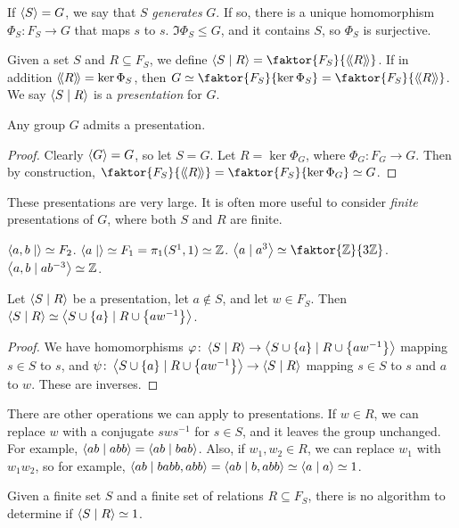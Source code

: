 If \( \left\langle{} S \right\rangle = G \), we say that \( S \) \emph{generates} \( G \).
If so, there is a unique homomorphism \( \Phi_S \colon F_S \to G \) that maps \( s \) to \( s \).
\( \Im \Phi_S \leq G \), and it contains \( S \), so \( \Phi_S \) is surjective.
\begin{definition}
	Given a set \( S \) and \( R \subseteq F_S \), we define \( \genset{S\mid R} = \faktor{F_S}{\ngenset R} \).
	If in addition \( \left\langle\!\left\langle{} R \right\rangle\!\right\rangle = \ker \Phi_S \), then \( G \simeq \faktor{F_S}{\ker \Phi_S} = \faktor{F_S}{\ngenset R} \).
	We say \( \left\langle{} S\mid R \right\rangle \) is a \emph{presentation} for \( G \).
\end{definition}
\begin{proposition}
	Any group \( G \) admits a presentation.
\end{proposition}
\begin{proof}
	Clearly \( \left\langle{} G \right\rangle = G \), so let \( S = G \).
	Let \( R = \ker \Phi_G \), where \( \Phi_G \colon F_G \to G \).
	Then by construction, \( \faktor{F_S}{\ngenset R} = \faktor{F_S}{\ker \Phi_G} \simeq G \).
\end{proof}
\begin{remark}
	These presentations are very large.
	It is often more useful to consider \emph{finite} presentations of \( G \), where both \( S \) and \( R \) are finite.
\end{remark}
\begin{example}
	\( \left\langle{} a,b \mid \right\rangle \simeq F_2 \).
	\( \left\langle{} a \mid \right\rangle \simeq F_1 = \pi_1(S^1,1) \simeq \mathbb Z \).
	\( \genset{a \mid a^3} \simeq \faktor{\mathbb Z}{3\mathbb Z} \).
	\( \left\langle{} a, b \mid ab^{-3} \right\rangle \simeq \mathbb Z \).
\end{example}
\begin{proposition}
	Let \( \left\langle{} S\mid R \right\rangle \) be a presentation, let $a \not\in S$, and let \( w \in F_S \).
	Then \( \left\langle{} S \mid R \right\rangle \simeq \left\langle{} S \cup \qty{a} \mid R \cup \qty{aw^{-1}} \right\rangle \).
\end{proposition}
\begin{proof}
	We have homomorphisms \( \varphi \colon \left\langle{} S \mid R \right\rangle \to \left\langle{} S \cup \qty{a} \mid R \cup \qty{aw^{-1}} \right\rangle \) mapping \( s \in S \) to \( s \), and \( \psi \colon \left\langle{} S \cup \qty{a} \mid R \cup \qty{aw^{-1}} \right\rangle \to \left\langle{} S \mid R \right\rangle \) mapping \( s \in S \) to \( s \) and \( a \) to \( w \).
	These are inverses.
\end{proof}
There are other operations we can apply to presentations.
If \( w \in R \), we can replace \( w \) with a conjugate \( sws^{-1} \) for \( s \in S \), and it leaves the group unchanged.
For example, \( \left\langle{} ab \mid abb \right\rangle = \left\langle{} ab \mid bab \right\rangle \).
Also, if \( w_1, w_2 \in R \), we can replace \( w_1 \) with \( w_1w_2 \), so for example, \( \left\langle{} ab \mid babb, abb \right\rangle = \left\langle{} ab \mid b, abb \right\rangle \simeq \left\langle{} a \mid a \right\rangle \simeq 1 \).
\begin{theorem}
	Given a finite set \( S \) and a finite set of relations \( R \subseteq F_S \), there is no algorithm to determine if \( \left\langle{} S \mid R \right\rangle \simeq 1 \).
\end{theorem}

